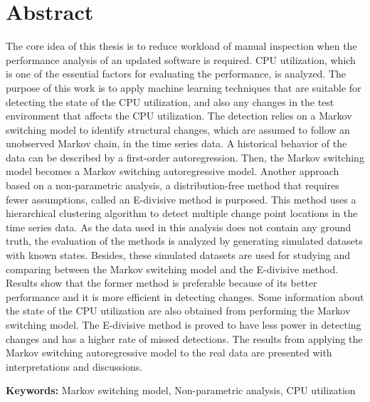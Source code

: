 
\chapter*{Abstract}


The core idea of this thesis is to reduce workload of manual inspection
when the performance analysis of an updated software is required.
CPU utilization, which is one of the essential factors for evaluating
the performance, is analyzed. The purpose of this work is to apply
machine learning techniques that are suitable for detecting the state
of the CPU utilization, and also any changes in the test environment
that affects the CPU utilization. The detection relies on a Markov
switching model to identify structural changes, which are assumed
to follow an unobserved Markov chain, in the time series data. A historical
behavior of the data can be described by a first-order autoregression.
Then, the Markov switching model becomes a Markov switching autoregressive
model. Another approach based on a non-parametric analysis, a distribution-free
method that requires fewer assumptions, called an E-divisive method
is purposed. This method uses a hierarchical clustering algorithm
to detect multiple change point locations in the time series data.
As the data used in this analysis does not contain any ground truth,
the evaluation of the methods is analyzed by generating simulated
datasets with known states. Besides, these simulated datasets are
used for studying and comparing between the Markov switching model
and the E-divisive method. Results show that the former method is
preferable because of its better performance and it is more efficient
in detecting changes. Some information about the state of the CPU
utilization are also obtained from performing the Markov switching
model. The E-divisive method is proved to have less power in detecting
changes and has a higher rate of missed detections. The results from
applying the Markov switching autoregressive model to the real data
are presented with interpretations and discussions. 

\textbf{Keywords:} Markov switching model, Non-parametric analysis,
CPU utilization
